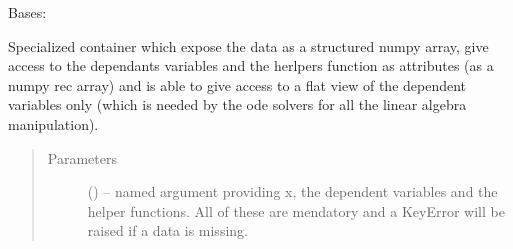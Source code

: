 \documentclass[letterpaper,10pt,english]{sphinxmanual}
\begin{document}
\begin{fulllineitems}
\label{\detokenize{triflow.core:triflow.core.fields.BaseFields}}
Bases: 

Specialized container which expose the data as a structured numpy array,
give access to the dependants variables and the herlpers function as
attributes (as a numpy rec array) and is able to give access to a flat
view of the dependent variables only (which is needed by the ode
solvers for all the linear algebra manipulation).
\begin{quote}\begin{description}
\item[{Parameters}] \leavevmode
{} () -- named argument providing x, the dependent variables and the helper functions. All of these are mendatory and a KeyError will be raised if a data is missing.

\end{description}\end{quote}

\begin{fulllineitems}
\label{\detokenize{triflow.core:triflow.core.fields.BaseFields.array}}

\end{fulllineitems}



\begin{fulllineitems}
\end{fulllineitems}


\begin{fulllineitems}
\label{\detokenize{triflow.core:triflow.core.fields.BaseFields.size}}

\end{fulllineitems}



\begin{fulllineitems}
\end{fulllineitems}


\end{fulllineitems}
\end{document}
